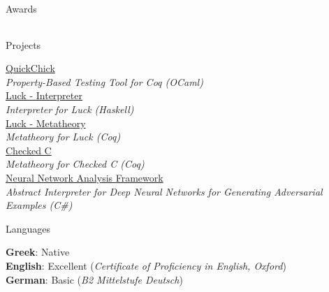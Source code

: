 \documentclass{resume} %
\begin{document}
\begin{rSection}{Awards}
\begin{longtable}{rl}
\end{longtable}

\end{rSection}


\begin{rSection}{Projects}

  \href{https://github.com/QuickChick/QuickChick}{QuickChick}\\
  \hspace*{2em} \emph{Property-Based Testing Tool for Coq (OCaml)}\\
  \href {https://github.com/QuickChick/Luck/tree/master/luck}{Luck - Interpreter}\\
  \hspace*{2em} \emph{Interpreter for Luck (Haskell)}\\
  \href{https://github.com/QuickChick/Luck/tree/master/coq}{Luck - Metatheory}\\
  \hspace*{2em} \emph{Metatheory for Luck (Coq)}\\
  \href{https://github.com/plum-umd/checkedc/tree/master/coq}{Checked C}\\
  \hspace*{2em} \emph{Metatheory for Checked C (Coq)}\\
  \href{https://github.com/microsoft/NeuralNetworkAnalysis}{Neural Network Analysis Framework}\\
  \hspace*{2em} \emph{Abstract Interpreter for Deep Neural Networks for Generating Adversarial Examples (C\#)}

\end{rSection}

\begin{rSection}{Languages}

  {\bf Greek}: Native \\
  {\bf English}: Excellent ({\em Certificate of Proficiency in English, Oxford})\\
  {\bf German}: Basic ({\em B2 Mittelstufe Deutsch})\\
\end{rSection}



\end{document}
